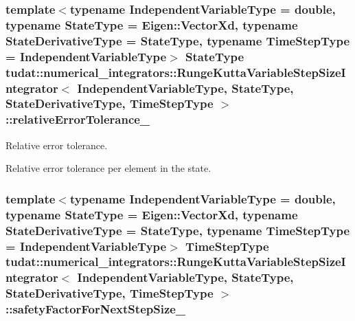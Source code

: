 \subsubsection[{\texorpdfstring{relative\+Error\+Tolerance\+\_\+}{relativeErrorTolerance_}}]{\setlength{\rightskip}{0pt plus 5cm}template$<$typename Independent\+Variable\+Type  = double, typename State\+Type  = Eigen\+::\+Vector\+Xd, typename State\+Derivative\+Type  = State\+Type, typename Time\+Step\+Type  = Independent\+Variable\+Type$>$ State\+Type {\bf tudat\+::numerical\+\_\+integrators\+::\+Runge\+Kutta\+Variable\+Step\+Size\+Integrator}$<$ Independent\+Variable\+Type, State\+Type, State\+Derivative\+Type, Time\+Step\+Type $>$\+::relative\+Error\+Tolerance\+\_\+\hspace{0.3cm}{\ttfamily [protected]}}\hypertarget{classtudat_1_1numerical__integrators_1_1RungeKuttaVariableStepSizeIntegrator_ab5106397b1ac1265bbff90dd61d5fa6d}{}\label{classtudat_1_1numerical__integrators_1_1RungeKuttaVariableStepSizeIntegrator_ab5106397b1ac1265bbff90dd61d5fa6d}


Relative error tolerance. 

Relative error tolerance per element in the state. 
\subsubsection[{\texorpdfstring{safety\+Factor\+For\+Next\+Step\+Size\+\_\+}{safetyFactorForNextStepSize_}}]{\setlength{\rightskip}{0pt plus 5cm}template$<$typename Independent\+Variable\+Type  = double, typename State\+Type  = Eigen\+::\+Vector\+Xd, typename State\+Derivative\+Type  = State\+Type, typename Time\+Step\+Type  = Independent\+Variable\+Type$>$ Time\+Step\+Type {\bf tudat\+::numerical\+\_\+integrators\+::\+Runge\+Kutta\+Variable\+Step\+Size\+Integrator}$<$ Independent\+Variable\+Type, State\+Type, State\+Derivative\+Type, Time\+Step\+Type $>$\+::safety\+Factor\+For\+Next\+Step\+Size\+\_\+\hspace{0.3cm}{\ttfamily [protected]}}\hypertarget{classtudat_1_1numerical__integrators_1_1RungeKuttaVariableStepSizeIntegrator_aaf907ca159430a0419af1303d308679a}{}\label{classtudat_1_1numerical__integrators_1_1RungeKuttaVariableStepSizeIntegrator_aaf907ca159430a0419af1303d308679a}


